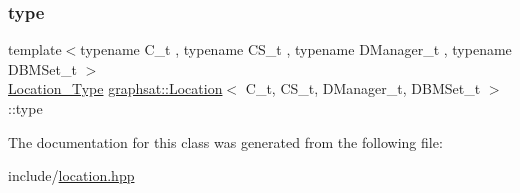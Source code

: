 \mbox{\label{classgraphsat_1_1_location_acb7fb525e22f6d11b60fc876381e9b56}} 
\subsubsection{\texorpdfstring{type}{type}}
{\footnotesize\ttfamily template$<$typename C\+\_\+t , typename C\+S\+\_\+t , typename D\+Manager\+\_\+t , typename D\+B\+M\+Set\+\_\+t $>$ \\
\mbox{\hyperlink{namespacegraphsat_a2ea948010388eb8178aa254a3b2023c9}{Location\+\_\+\+Type}} \mbox{\hyperlink{classgraphsat_1_1_location}{graphsat\+::\+Location}}$<$ C\+\_\+t, C\+S\+\_\+t, D\+Manager\+\_\+t, D\+B\+M\+Set\+\_\+t $>$\+::type\hspace{0.3cm}{\ttfamily [private]}}



The documentation for this class was generated from the following file\+:\begin{DoxyCompactItemize}
\item 
include/\mbox{\hyperlink{location_8hpp}{location.\+hpp}}\end{DoxyCompactItemize}
